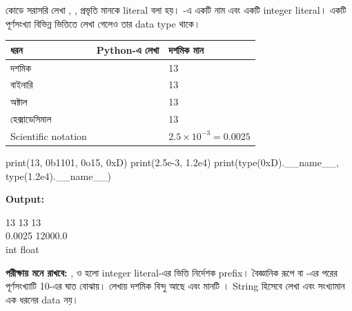 
কোডে সরাসরি লেখা , ,  প্রভৃতি মানকে
literal বলা হয়। -এ  একটি নাম এবং
 একটি integer literal। একটি পূর্ণসংখ্যা বিভিন্ন ভিত্তিতে লেখা গেলেও
তার data type  থাকে।

\begin{tabularx}{\linewidth}{|l|Y|Y|}
\hline
{}\textbf{ধরন} & \textbf{Python-এ লেখা} & \textbf{দশমিক মান}\\\hline
দশমিক &  & 13\\\hline
বাইনারি &  & 13\\\hline
অক্টাল &  & 13\\\hline
হেক্সাডেসিমাল &  & 13\\\hline
Scientific notation &  & \(2.5\times10^{-3}=0.0025\)\\\hline
\end{tabularx}

\begin{pythoncode}
print(13, 0b1101, 0o15, 0xD)
print(2.5e-3, 1.2e4)
print(type(0xD).__name__, type(1.2e4).__name__)
\end{pythoncode}
\textbf{Output:}
\begin{codebox}\begin{english} 13 13 13\\
0.0025 12000.0\\
int float
\end{english}\end{codebox}

\textbf{পরীক্ষায় মনে রাখবে:} ,  ও  হলো
integer literal-এর ভিত্তি নির্দেশক prefix। বৈজ্ঞানিক রূপে  বা
-এর পরের পূর্ণসংখ্যাটি 10-এর ঘাত বোঝায়।  লেখায়
দশমিক বিন্দু আছে এবং মানটি । String হিসেবে লেখা
 এবং সংখ্যামান  এক ধরনের data নয়।


